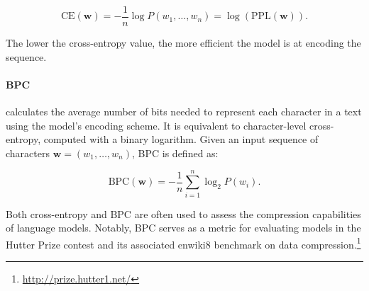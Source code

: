 \begin{equation}
    \text{CE}(\bm{w}) = - \dfrac{1}{n} \log P(w_1, \ldots, w_n) = \log \left(\text{PPL}(\bm{w})\right).
\end{equation}

\noindent The lower the cross-entropy value, the more efficient the model is at encoding the sequence. 






\paragraph{\ac{BPC}} calculates the average number of bits needed to represent each character in a text using the model's encoding scheme. It is equivalent to character-level cross-entropy, computed with a binary logarithm. Given an input sequence of characters $\bm{w} = (w_1, \ldots, w_n)$, \ac{BPC} is defined as:

\begin{equation}
    \text{BPC}(\bm{w}) = - \dfrac{1}{n} \sum_{i=1}^n \log_2 P(w_i).
\end{equation}

\noindent Both cross-entropy and \ac{BPC} are often used to assess the compression capabilities of language models. Notably, \ac{BPC} serves as a metric for evaluating models in the Hutter Prize contest and its associated enwiki8 benchmark on data compression.\footnote{\url{http://prize.hutter1.net/}} \\

